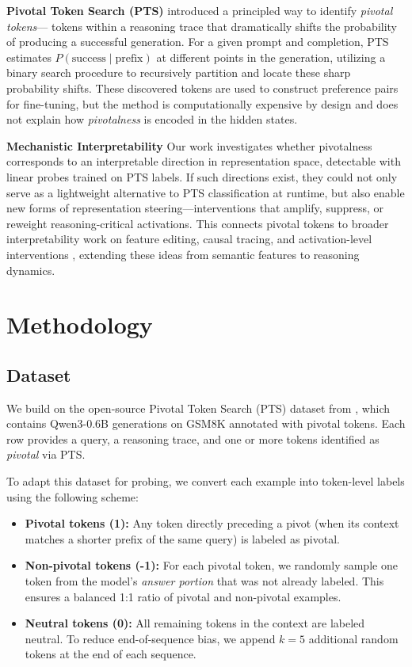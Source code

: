 \documentclass{article}
\begin{document}
\textbf{Pivotal Token Search (PTS)}\citep{abdin2024phi4technicalreport, pts} introduced a principled way to identify \textit{pivotal tokens}— tokens within a reasoning trace that dramatically shifts the probability of producing a successful generation. For a given prompt and completion, PTS estimates $P(\text{success} \mid \text{prefix})$ at different points in the generation, utilizing a binary search procedure to recursively partition and locate these sharp probability shifts. These discovered tokens are used to construct preference pairs for fine-tuning, but the method is computationally expensive by design and does not explain how \textit{pivotalness} is encoded in the hidden states.


\textbf{Mechanistic Interpretability} Our work investigates whether pivotalness corresponds to an interpretable direction in representation space, detectable with linear probes trained on PTS labels. If such directions exist, they could not only serve as a lightweight alternative to PTS classification at runtime, but also enable new forms of representation steering—interventions that amplify, suppress, or reweight reasoning-critical activations. This connects pivotal tokens to broader interpretability work on feature editing, causal tracing, and activation-level interventions \citep{elhage2022toymodelsofsuperposition, subramani2022extractinglatentsteeringvectors, huang2024steering}, extending these ideas from semantic features to reasoning dynamics.





\section{Methodology}
\label{headings}

\subsection{Dataset}
We build on the open-source Pivotal Token Search (PTS) dataset from \citet{codelionQwen3}, which contains Qwen3-0.6B generations on GSM8K annotated with pivotal tokens. Each row provides a query, a reasoning trace, and one or more tokens identified as \textit{pivotal} via PTS.

To adapt this dataset for probing, we convert each example into token-level labels using the following scheme:
\begin{itemize}
    \item \textbf{Pivotal tokens (1):} Any token directly preceding a pivot (when its context matches a shorter prefix of the same query) is labeled as pivotal.
    \item \textbf{Non-pivotal tokens (-1):} For each pivotal token, we randomly sample one token from the model’s \textit{answer portion} that was not already labeled. This ensures a balanced 1:1 ratio of pivotal and non-pivotal examples.
    \item \textbf{Neutral tokens (0):} All remaining tokens in the context are labeled neutral. To reduce end-of-sequence bias, we append $k=5$ additional random tokens at the end of each sequence.
\end{itemize}
\end{document}
